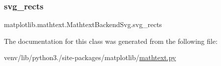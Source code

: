 \subsubsection{\texorpdfstring{svg\+\_\+rects}{svg\_rects}}
{\footnotesize\ttfamily matplotlib.\+mathtext.\+Mathtext\+Backend\+Svg.\+svg\+\_\+rects}



The documentation for this class was generated from the following file\+:\begin{DoxyCompactItemize}
\item 
venv/lib/python3./site-\/packages/matplotlib/\hyperlink{mathtext_8py}{mathtext.\+py}\end{DoxyCompactItemize}
